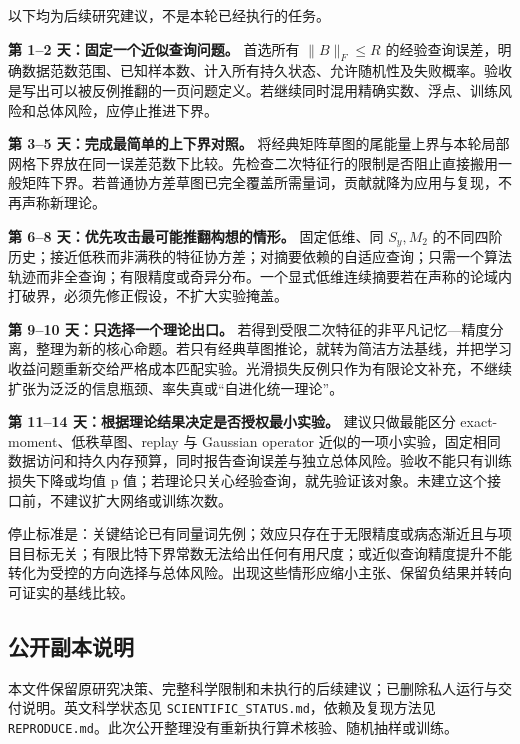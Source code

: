 \documentclass[11pt]{article}
\begin{document}
以下均为后续研究建议，不是本轮已经执行的任务。

\textbf{第 1--2 天：固定一个近似查询问题。} 首选所有 \(\|B\|_F\le R\) 的经验查询误差，明确数据范数范围、已知样本数、计入所有持久状态、允许随机性及失败概率。验收是写出可以被反例推翻的一页问题定义。若继续同时混用精确实数、浮点、训练风险和总体风险，应停止推进下界。

\textbf{第 3--5 天：完成最简单的上下界对照。} 将经典矩阵草图的尾能量上界与本轮局部网格下界放在同一误差范数下比较。先检查二次特征行的限制是否阻止直接搬用一般矩阵下界。若普通协方差草图已完全覆盖所需量词，贡献就降为应用与复现，不再声称新理论。

\textbf{第 6--8 天：优先攻击最可能推翻构想的情形。} 固定低维、同 \(S_y,M_2\) 的不同四阶历史；接近低秩而非满秩的特征协方差；对摘要依赖的自适应查询；只需一个算法轨迹而非全查询；有限精度或奇异分布。一个显式低维连续摘要若在声称的论域内打破界，必须先修正假设，不扩大实验掩盖。

\textbf{第 9--10 天：只选择一个理论出口。} 若得到受限二次特征的非平凡记忆---精度分离，整理为新的核心命题。若只有经典草图推论，就转为简洁方法基线，并把学习收益问题重新交给严格成本匹配实验。光滑损失反例只作为有限论文补充，不继续扩张为泛泛的信息瓶颈、率失真或``自进化统一理论''。

\textbf{第 11--14 天：根据理论结果决定是否授权最小实验。} 建议只做最能区分 exact-moment、低秩草图、replay 与 Gaussian operator 近似的一项小实验，固定相同数据访问和持久内存预算，同时报告查询误差与独立总体风险。验收不能只有训练损失下降或均值 p 值；若理论只关心经验查询，就先验证该对象。未建立这个接口前，不建议扩大网络或训练次数。

停止标准是：关键结论已有同量词先例；效应只存在于无限精度或病态渐近且与项目目标无关；有限比特下界常数无法给出任何有用尺度；或近似查询精度提升不能转化为受控的方向选择与总体风险。出现这些情形应缩小主张、保留负结果并转向可证实的基线比较。

\subsection{公开副本说明}

本文件保留原研究决策、完整科学限制和未执行的后续建议；已删除私人运行与交付说明。英文科学状态见 \nolinkurl{SCIENTIFIC_STATUS.md}，依赖及复现方法见 \nolinkurl{REPRODUCE.md}。此次公开整理没有重新执行算术核验、随机抽样或训练。
\end{document}
